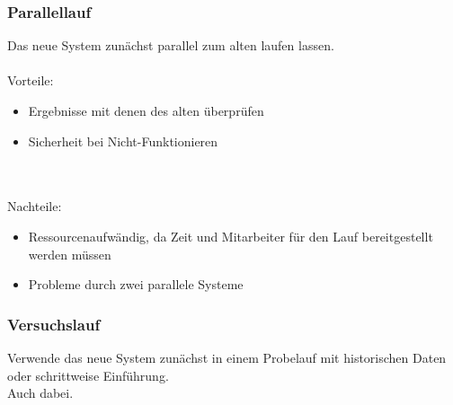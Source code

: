 \subsubsection{Parallellauf}
Das neue System zunächst parallel zum alten laufen lassen.
\\\\
Vorteile:
\begin{itemize}
    \item Ergebnisse mit denen des alten überprüfen
    \item Sicherheit bei Nicht-Funktionieren
\end{itemize}
\\\\
Nachteile:
\begin{itemize}
    \item Ressourcenaufwändig, da Zeit und Mitarbeiter für den Lauf bereitgestellt werden müssen
    \item Probleme durch zwei parallele Systeme
\end{itemize}

\subsubsection{Versuchslauf}
Verwende das neue System zunächst in einem Probelauf mit historischen Daten oder schrittweise Einführung.
\\
Auch dabei.